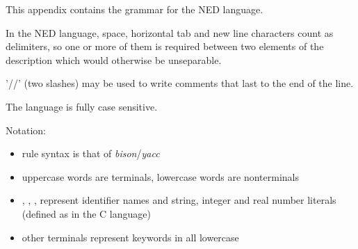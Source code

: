 \label{cha:ned-language-grammar}

This appendix contains the grammar for the NED language.

In the NED language, space, horizontal tab and new line characters count
as delimiters, so one or more of them is required between two elements of the
description which would otherwise be unseparable.

'//' (two slashes) may be used to write comments that last to the end of the line.

The language is fully case sensitive.

Notation:
\begin{itemize}
  \item{rule syntax is that of \textit{bison}/\textit{yacc}}
  \item{uppercase words are terminals, lowercase words are nonterminals}
  \item{, , ,
         represent identifier names and string,
        integer and real number literals (defined as in the C language)}
  \item{other terminals represent keywords in all lowercase}
\end{itemize}


%
%
%
%
%

